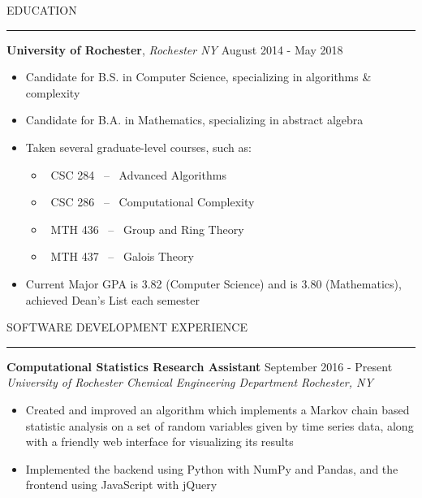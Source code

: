 \documentclass{report}
\begin{document}

\vspace*{-14pt}
{ } 
\hfill 
{} \vspace*{-5pt}

\vspace{10pt} EDUCATION
\vspace{4pt} \textcolor{gray}{\hrule}
\vspace{14pt} \textbf{University of Rochester}, \textit{Rochester NY} \hfill August 2014 - May 2018
\begin{itemize} [noitemsep,topsep=4pt]
	\item Candidate for B.S. in Computer Science, specializing in algorithms \& complexity
	\item Candidate for B.A. in Mathematics, specializing in abstract algebra
	\item Taken several graduate-level courses, such as: \begin{multicols}{2} \begin{itemize}[noitemsep, topsep=0pt]
		\item[\textbullet] ~CSC 284 ~--~ Advanced Algorithms
		\item[\textbullet] ~CSC 286 ~--~ Computational Complexity
		\item[\textbullet] ~MTH 436 ~--~ Group and Ring Theory
		\item[\textbullet] ~MTH 437 ~--~ Galois Theory
		\end{itemize} \end{multicols}
	\item Current Major GPA is 3.82 (Computer Science) and is 3.80 (Mathematics), achieved Dean's List each semester
\end{itemize}

\vspace{8pt} SOFTWARE DEVELOPMENT EXPERIENCE
\vspace{4pt} \textcolor{gray}{\hrule}

\vspace{14pt} \textbf{Computational Statistics Research Assistant} \hfill September 2016 - Present \\
\textit{University of Rochester Chemical Engineering Department \hfill Rochester, NY}
\begin{itemize} [noitemsep,topsep=4pt]
	\item Created and improved an algorithm which implements a Markov chain based statistic analysis on a set of random variables given by time series data, along with a friendly web interface for visualizing its results
	\item Implemented the backend using Python with NumPy and Pandas, and the frontend using JavaScript with jQuery
\end{itemize}
\end{document}
